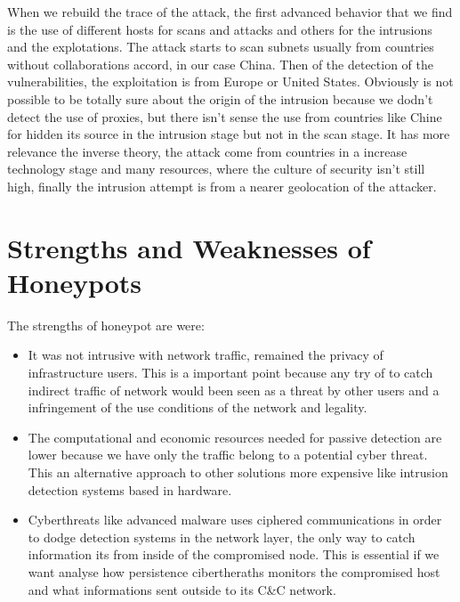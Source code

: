 \documentclass[a4paper]{llncs}
\begin{document}
When we rebuild the trace of the attack, the first advanced behavior that we find is the use of different hosts for scans and attacks and others for the intrusions and the explotations. The attack starts to scan subnets usually from countries without collaborations accord, in our case China. Then of the detection of the vulnerabilities, the exploitation is from Europe or United States. Obviously is not possible to be totally sure about the origin of the intrusion because we dodn't detect the use of proxies, but there isn't sense the use from countries like Chine for hidden its source in the intrusion stage but not in the scan stage. It has more relevance the inverse theory, the attack come from countries in a increase technology stage and many resources, where the culture of security isn't still high, finally the intrusion attempt is from a nearer geolocation of the attacker.


\section{Strengths and Weaknesses of Honeypots}
The strengths of honeypot are were:
\begin{itemize}
\item It was not intrusive with network traffic, remained the privacy of infrastructure users. This is a important point because any try of to catch indirect traffic of network would been seen as a threat by other users and a infringement of the use conditions of the network and legality.
\item The computational and economic resources needed for passive detection are lower because we have only the traffic belong to a potential cyber threat. This an alternative approach to other solutions more expensive like intrusion detection systems based in hardware.
\item Cyberthreats like advanced malware uses ciphered communications in order to dodge detection systems in the network layer, the only way to catch information its from inside of the compromised node. This is essential if we want analyse how persistence cibertheraths monitors the compromised host and what informations sent outside to its C\&C network.
\end{itemize}
\end{document}
